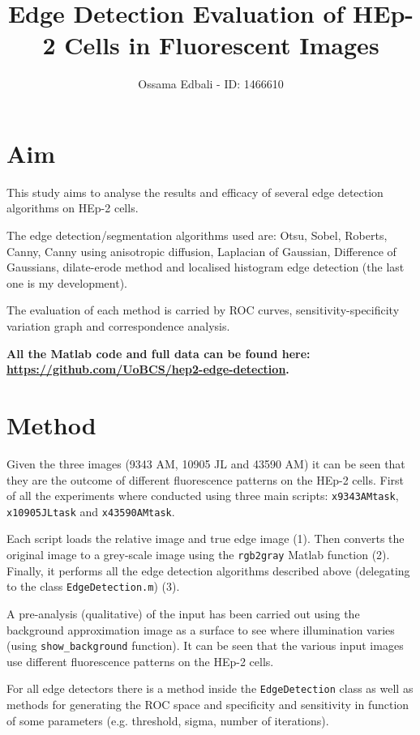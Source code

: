 \documentclass{article}
\title{Edge Detection Evaluation of HEp-2 Cells in Fluorescent Images}
\author{Ossama Edbali - ID: 1466610}
\begin{document}
	
	\maketitle	
	
	\section{Aim}
	
	This study aims to analyse the results and efficacy of several edge detection algorithms
	on HEp-2 cells.
	
	The edge detection/segmentation algorithms used are: Otsu, Sobel, Roberts, Canny,
	Canny using anisotropic diffusion,
	Laplacian of Gaussian, Difference of Gaussians, dilate-erode method and localised
	histogram edge detection (the last one is my development).
	
	The evaluation of each method is carried by ROC curves, sensitivity-specificity variation graph and correspondence analysis.
	
	\textbf{All the Matlab code and full data can be found here: \url{https://github.com/UoBCS/hep2-edge-detection}.}
	
	\section{Method}

	Given the three images (9343 AM, 10905 JL and 43590 AM) it can be seen that they
	are the outcome of different fluorescence patterns on the HEp-2 cells.
	First of all the experiments where conducted using three main scripts:
	\texttt{x9343AMtask}, \texttt{x10905JLtask} and \texttt{x43590AMtask}.
	
	Each script loads the relative image and true edge image (1). Then converts the original image to a grey-scale image using the \texttt{rgb2gray} Matlab function (2).
	Finally, it performs all the edge detection algorithms described above (delegating
		to the class \texttt{EdgeDetection.m}) (3).
	
	A pre-analysis (qualitative) of the input has been carried out using the
	background approximation image as a surface to see where illumination varies (using \verb|show_background| function).
	It can be seen that the various input images use different fluorescence patterns on
	the HEp-2 cells.	
	
	For all edge detectors there is a method inside the \texttt{EdgeDetection} class
	as well as methods for generating the ROC space and specificity and sensitivity
	in function of some parameters (e.g. threshold, sigma, number of iterations).
	
\end{document}
